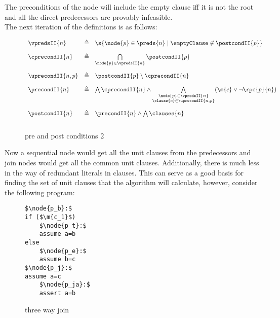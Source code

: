 The preconditions of the node will include the empty clause iff it is not the root and all the direct predecessors are provably infeasible.\\
The next iteration of the definitions is as follows:
\begin{figure}[H]
$
\begin{array}{lll}
	\vspace{10pt}
	\vpredsII{n}     & \triangleq & \s{\node{p} \in \preds{n} \mid  \emptyClause \not\in \postcondII{p}} \\
	\vspace{10pt}
	\cprecondII{n}   & \triangleq & \bigcap\limits_{\node{p} \in \vpredsII{n}} \postcondII{p} \\
	\vspace{10pt}
	\uprecondII{n,p} & \triangleq & \postcondII{p} \setminus \cprecondII{n} \\
	\vspace{10pt}
	\precondII{n}    & \triangleq & \bigwedge\cprecondII{n} \wedge \bigwedge\limits_{\substack{\node{p} \in \vpredsII{n}\\\clause{c} \in \uprecondII{n,p}}} 
	(\m{c} \lor \lnot \rpc{p}{n})\\
	\vspace{10pt}
	\postcondII{n} & \triangleq & \precondII{n} \land \bigwedge \clauses{n}
\end{array}
$
\caption{pre and post conditions 2}
\end{figure}

Now a sequential node would get all the unit clauses from the predecessors and join nodes would get all the common unit clauses.
Additionally, there is much less in the way of redundant literals in clauses.
This can serve as a good basis for finding the set of unit clauses that the algorithm will calculate, however, consider the following program:
\begin{figure}[H]
\begin{lstlisting}
$\node{p_b}:$
if ($\m{c_1}$)
	$\node{p_t}:$
	assume a=b
else
	$\node{p_e}:$
	assume b=c
$\node{p_j}:$
assume a=c
	$\node{p_ja}:$
	assert a=b
\end{lstlisting}
\caption{three way join}
\label{snippet3.1}
\end{figure}

